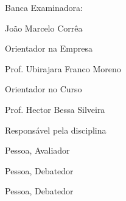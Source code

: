 
%
% 
%
\begin{folhadeaprovacao}


\thispagestyle{empty}

{\large Banca Examinadora:}

\vspace{1.3cm}

\begin{flushright}

{\large João Marcelo Corrêa}

{\large Orientador na Empresa}

\vspace{1.2cm}
{\large Prof. Ubirajara Franco Moreno}

{\large Orientador no Curso}

\vspace{1.2cm}
 
{\large Prof. Hector Bessa Silveira}

{\large Responsável pela disciplina}

\vspace{1cm}

{\large Pessoa, Avaliador}

\vspace{0.8cm}

{\large Pessoa, Debatedor}

\vspace{0.8cm}

{\large Pessoa, Debatedor}

\end{flushright}
  
\end{folhadeaprovacao}